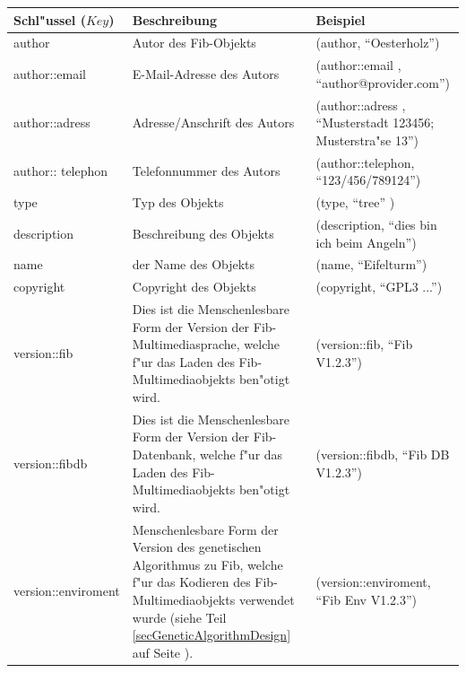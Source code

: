 \begin{small}
\begin{center}
\begin{longtable}{|p{23mm}|p{60mm}|p{40mm}|}\hline
	Schl"ussel ($Key$) &  Beschreibung & Beispiel \\\hline\endhead
	author & Autor des Fib-Objekts & (author, ``Oesterholz'')\\\hline
	author::email & E-Mail-Adresse des Autors & (author::email , ``author@provider.com'')\\\hline
	author::adress & Adresse/Anschrift des Autors & (author::adress , ``Musterstadt 123456; Musterstra"se 13'')\\\hline
	author:: telephon & Telefonnummer des Autors & (author::telephon, ``123/456/789124'')\\\hline
	type & Typ des Objekts & (type, ``tree'' )\\\hline
	description & Beschreibung des Objekts & (description, ``dies bin ich beim Angeln'')\\\hline
	name & der Name des Objekts & (name, ``Eifelturm'')\\\hline
	copyright & Copyright des Objekts & (copyright, ``GPL3 ...'')\\\hline
	version::fib & Dies ist die Menschenlesbare Form der Version der Fib-Multimediasprache, welche f"ur das Laden des Fib-Multimediaobjekts ben"otigt wird. & (version::fib, ``Fib V1.2.3'')\\\hline
	version::fibdb & Dies ist die Menschenlesbare Form der Version der Fib-Datenbank, welche f"ur das Laden des Fib-Multimediaobjekts ben"otigt wird. & (version::fibdb, ``Fib DB V1.2.3'')\\\hline
	version::\-enviroment & Menschenlesbare Form der Version des genetischen Algorithmus zu Fib, welche f"ur das Kodieren des Fib-Multimediaobjekts verwendet wurde (siehe Teil \ref{secGeneticAlgorithmDesign} auf Seite \pageref{secGeneticAlgorithmDesign} ). & (version::enviroment, ``Fib Env V1.2.3'')\\\hline


\end{longtable}
\end{center}
\end{small}
